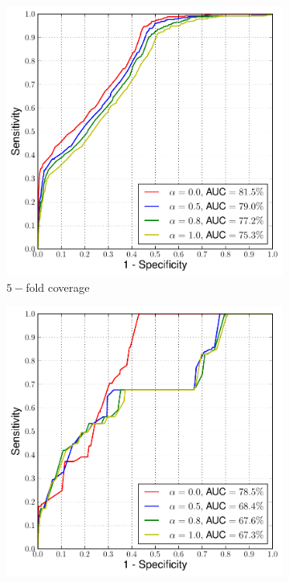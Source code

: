  \begin{figure}
\centering
\begin{subfigure}{.33\textwidth}
  \centering
  \includegraphics[width=\linewidth]{figures/5fold-a}
  \caption{$5-$fold coverage}
\end{subfigure}%
\begin{subfigure}{.33\textwidth}
  \centering
  \includegraphics[width=\linewidth]{figures/10fold-a}

\end{subfigure}
\end{figure}
